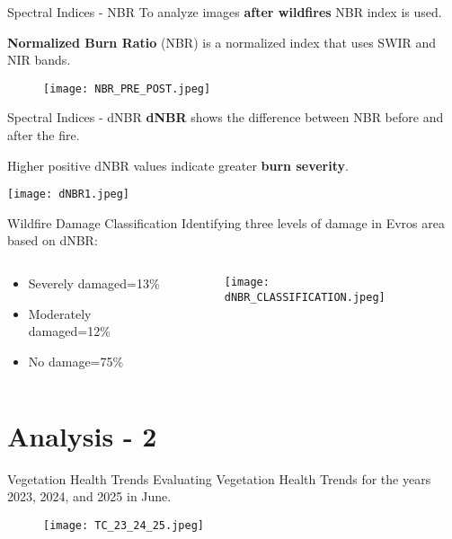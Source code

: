 \documentclass{beamer} %
\begin{document}
\begin{frame}{Spectral Indices - NBR}
 To analyze images \textbf{after wildfires} NBR index is used.
 
 \textbf{Normalized Burn Ratio} (NBR) is a normalized index that uses SWIR and NIR bands.

 \begin{figure}
    \centering
    \texttt{[image: NBR\_PRE\_POST.jpeg]}
   \end{figure}
\end{frame}

\begin{frame}{Spectral Indices - dNBR}
\textbf{dNBR} shows the difference between NBR before and after the fire.

\bigskip
Higher positive dNBR values indicate greater \textbf{burn severity}.

\begin{center}
     \centering
     \texttt{[image: dNBR1.jpeg]}
 \end{center} 
\end{frame}

\begin{frame}{Wildfire Damage Classification}
 \centering Identifying three levels of damage in Evros area based on dNBR:
 
 \begin{columns}
    \begin{column}[t]{0.30\textwidth}
       \centering
       \bigskip
       \bigskip
        \begin{itemize}
         \item Severely damaged=13\%
         \item Moderately damaged=12\%
         \item No damage=75\%
         \end{itemize}
 \end{column} 

\begin{column}[t]{0.80\textwidth}
            \centering
            \begin{figure}
            \texttt{[image: dNBR\_CLASSIFICATION.jpeg]}  
            \end{figure}
 \end{column} 
 \end{columns}
\end{frame}

\section{Analysis - 2} 
\begin{frame}{Vegetation Health Trends}
 \bigskip
Evaluating Vegetation Health Trends for the years 2023, 2024, and 2025 in June.
\begin{figure}
            \texttt{[image: TC\_23\_24\_25.jpeg]}  
            \end{figure}
\end{frame}
\end{document}
